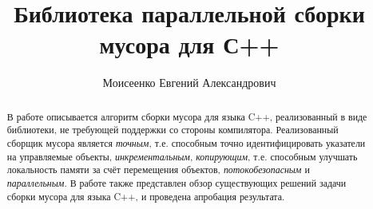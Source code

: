 \title{Библиотека параллельной сборки мусора для С++}


\author{Моисеенко Евгений Александрович}



\maketitle

\newcommand{\code}[1]{\textsf{#1}}

\begin{abstract}
В работе описывается алгоритм сборки мусора для языка C++, 
реализованный в виде библиотеки, не требующей поддержки со стороны компилятора. 
Реализованный сборщик мусора является 
\emph{точным}, т.е. способным точно идентифицировать указатели на управляемые объекты, 
\emph{инкрементальным}, 
\emph{копирующим}, т.е. способным улучшать локальность памяти за счёт перемещения объектов, 
\emph{потокобезопасным} и \emph{параллельным}. 
В работе также представлен обзор существующих решений задачи сборки мусора 
для языка C++, и проведена апробация результата.
\end{abstract}








